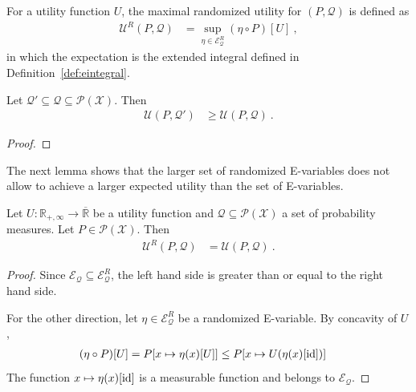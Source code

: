 \begin{definition}\label{def:maxRandUtility}
  \leanok
For a utility function $U$, the maximal randomized utility for $(P, \mathcal{Q})$ is defined as
\begin{align*}
  \mathcal{U}^R(P, \mathcal{Q})
  &= \sup_{\eta \in \mathcal{E}^R_{\mathcal{Q}}} (\eta \circ P)[U]
  \: ,
\end{align*}
in which the expectation is the extended integral defined in Definition~\ref{def:eintegral}.
\end{definition}


\begin{lemma}\label{lem:maxUtility_anti}
  \leanok
Let $\mathcal{Q}' \subseteq \mathcal{Q} \subseteq \mathcal{P}(\mathcal{X})$.
Then
\begin{align*}
  \mathcal{U}(P, \mathcal{Q}')
  &\ge \mathcal{U}(P, \mathcal{Q})
  \: .
\end{align*}
\end{lemma}

\begin{proof}\leanok

\end{proof}


The next lemma shows that the larger set of randomized E-variables does not allow to achieve a larger expected utility than the set of E-variables.

\begin{lemma}\label{lem:maxRandUtility_eq_maxUtility}
  \leanok
Let $U : \mathbb{R}_{+,\infty} \to \overline{\mathbb{R}}$ be a utility function and $\mathcal{Q} \subseteq \mathcal{P}(\mathcal{X})$ a set of probability measures.
Let $P \in \mathcal{P}(\mathcal{X})$. Then
\begin{align*}
  \mathcal{U}^R(P, \mathcal{Q})
  &= \mathcal{U}(P, \mathcal{Q})
  \: .
\end{align*}
\end{lemma}

\begin{proof}\leanok
Since $\mathcal{E}_{\mathcal{Q}} \subseteq \mathcal{E}^R_{\mathcal{Q}}$, the left hand side is greater than or equal to the right hand side.

For the other direction, let $\eta \in \mathcal{E}^R_{\mathcal{Q}}$ be a randomized E-variable.
By concavity of $U$,
\begin{align*}
  (\eta \circ P)[U]
  &= P[x \mapsto \eta(x)[U]]
  \le P[x \mapsto U(\eta(x)[\operatorname{id}])]
\end{align*}
The function $x \mapsto \eta(x)[\operatorname{id}]$ is a measurable function and belongs to $\mathcal{E}_{\mathcal{Q}}$.
\end{proof}


